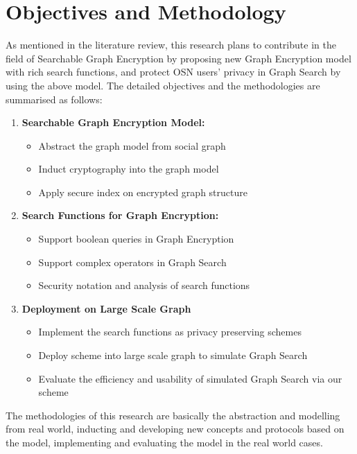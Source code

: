 \chapter{Objectives and Methodology}
As mentioned in the literature review, this research plans to contribute in the field of Searchable Graph Encryption by proposing new Graph Encryption model with rich search functions, and protect OSN users' privacy in Graph Search by using the above model. The detailed objectives and the methodologies are summarised as follows:
\begin{enumerate}
\setlength{\itemsep}{0pt}
\item {\bf Searchable Graph Encryption Model:}
\begin{itemize}
\setlength{\itemsep}{0pt}
\item Abstract the graph model from social graph
\item Induct cryptography into the graph model
\item Apply secure index on encrypted graph structure
\end{itemize}
\item{\bf Search Functions for Graph Encryption:}
\begin{itemize}
\setlength{\itemsep}{0pt}
\item Support boolean queries in Graph Encryption
\item Support complex operators in Graph Search
\item Security notation and analysis of search functions
\end{itemize}
\item{\bf Deployment on Large Scale Graph}
\begin{itemize}
\setlength{\itemsep}{0pt}
\item Implement the search functions as privacy preserving schemes
\item Deploy scheme into large scale graph to simulate Graph Search
\item Evaluate the efficiency and usability of simulated Graph Search via our scheme
\end{itemize}
\end{enumerate}

The methodologies of this research are basically the abstraction and modelling from real world, inducting and developing new concepts and protocols based on the model, implementing and evaluating the model in the real world cases.